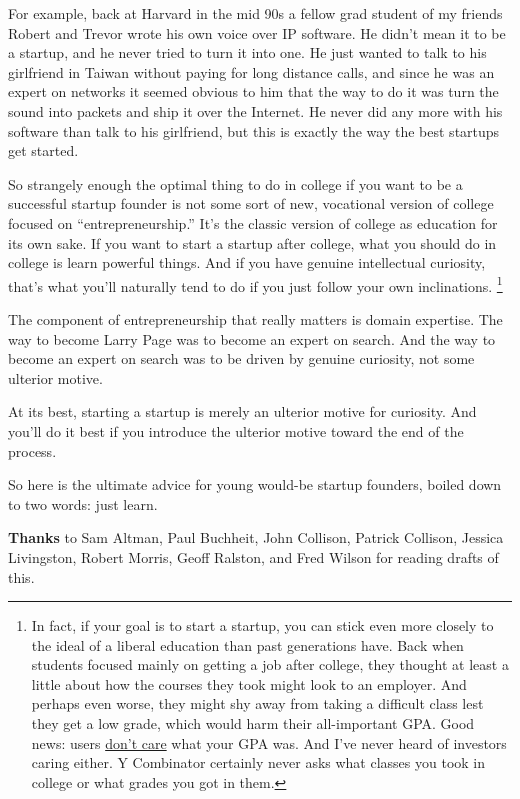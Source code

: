 For example, back at Harvard in the mid 90s a fellow grad student of my
friends Robert and Trevor wrote his own voice over IP software. He
didn't mean it to be a startup, and he never tried to turn it into one.
He just wanted to talk to his girlfriend in Taiwan without paying for
long distance calls, and since he was an expert on networks it seemed
obvious to him that the way to do it was turn the sound into packets and
ship it over the Internet. He never did any more with his software than
talk to his girlfriend, but this is exactly the way the best startups
get started.

So strangely enough the optimal thing to do in college if you want to be
a successful startup founder is not some sort of new, vocational version
of college focused on ``entrepreneurship.'' It's the classic version of
college as education for its own sake. If you want to start a startup
after college, what you should do in college is learn powerful things.
And if you have genuine intellectual curiosity, that's what you'll
naturally tend to do if you just follow your own inclinations.
\footnote{In fact, if your goal is to start a startup, you can stick even
more closely to the ideal of a liberal education than past generations
have. Back when students focused mainly on getting a job after college,
they thought at least a little about how the courses they took might
look to an employer. And perhaps even worse, they might shy away from
taking a difficult class lest they get a low grade, which would harm
their all-important GPA. Good news: users \href{credentials.html}{don't
care} what your GPA was. And I've never heard of investors caring
either. Y Combinator certainly never asks what classes you took in
college or what grades you got in them.}

The component of entrepreneurship that really matters is domain
expertise. The way to become Larry Page was to become an expert on
search. And the way to become an expert on search was to be driven by
genuine curiosity, not some ulterior motive.

At its best, starting a startup is merely an ulterior motive for
curiosity. And you'll do it best if you introduce the ulterior motive
toward the end of the process.

So here is the ultimate advice for young would-be startup founders,
boiled down to two words: just learn.


\textbf{Thanks} to Sam Altman, Paul Buchheit, John Collison, Patrick
Collison, Jessica Livingston, Robert Morris, Geoff Ralston, and Fred
Wilson for reading drafts of this.